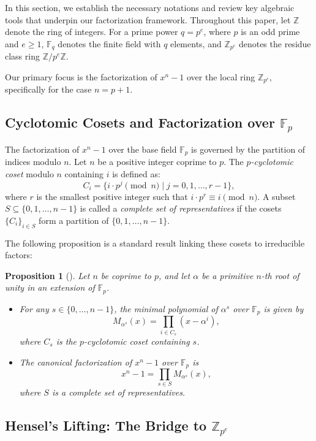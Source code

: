 \documentclass[12pt]{article}
\theoremstyle{plain}
\newtheorem{prop}{Proposition}
\numberwithin{equation}{section}
\begin{document}
In this section, we establish the necessary notations and review key algebraic tools that underpin our factorization framework. Throughout this paper, let $\mathbb{Z}$ denote the ring of integers. For a prime power $q=p^e$, where $p$ is an odd prime and $e \ge 1$, $\mathbb{F}_q$ denotes the finite field with $q$ elements, and $\mathbb{Z}_{p^e}$ denotes the residue class ring $\mathbb{Z}/p^e\mathbb{Z}$. 

Our primary focus is the factorization of $x^n - 1$ over the local ring $\mathbb{Z}_{p^e}$, specifically for the case $n=p+1$.

\subsection{Cyclotomic Cosets and Factorization over $\mathbb{F}_p$}

The factorization of $x^n-1$ over the base field $\mathbb{F}_p$ is governed by the partition of indices modulo $n$.
Let $n$ be a positive integer coprime to $p$. The \textit{$p$-cyclotomic coset} modulo $n$ containing $i$ is defined as:
$$C_i = \{i \cdot p^j \pmod n \mid j=0, 1, \dots, r-1\},$$
where $r$ is the smallest positive integer such that $i \cdot p^r \equiv i \pmod n$. A subset $S \subseteq \{0, 1, \dots, n-1\}$ is called a \textit{complete set of representatives} if the cosets $\{C_i\}_{i \in S}$ form a partition of $\{0, 1, \dots, n-1\}$.

The following proposition is a standard result linking these cosets to irreducible factors:

\begin{prop}[\cite{Lidl1997,Huffman2003}]\label{prop:cyc_coset}
Let $n$ be coprime to $p$, and let $\alpha$ be a primitive $n$-th root of unity in an extension of $\mathbb{F}_p$.
\begin{itemize}
    \item[(i)] For any $s \in \{0, \dots, n-1\}$, the minimal polynomial of $\alpha^s$ over $\mathbb{F}_p$ is given by
    $$M_{\alpha^s}(x) = \prod_{i \in C_s} (x - \alpha^i),$$
    where $C_s$ is the $p$-cyclotomic coset containing $s$.
    \item[(ii)] The canonical factorization of $x^n - 1$ over $\mathbb{F}_p$ is
    $$x^n - 1 = \prod_{s \in S} M_{\alpha^s}(x),$$
    where $S$ is a complete set of representatives.
\end{itemize}
\end{prop}

\subsection{Hensel's Lifting: The Bridge to $\mathbb{Z}_{p^e}$}
\end{document}
